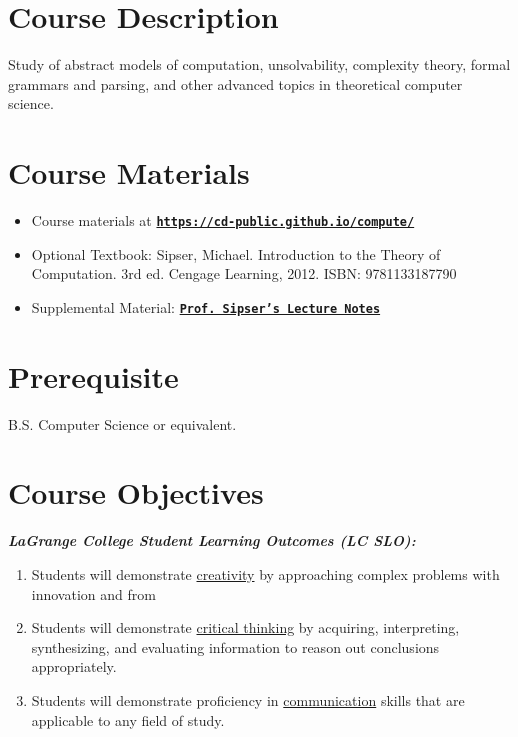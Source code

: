 \documentclass[11pt]{article}
\begin{document}

\section*{Course Description}

Study of abstract models of computation, unsolvability, complexity theory, formal grammars and parsing, and other advanced topics in theoretical computer science.


\section*{Course Materials}

\begin{itemize}
\item Course materials at \href{https://cd-public.github.io/compute/}{\tt\bf https://cd-public.github.io/compute/}
\item Optional Textbook: Sipser, Michael. Introduction to the Theory of Computation. 3rd ed. Cengage Learning, 2012. ISBN: 9781133187790
\item Supplemental Material: \href{https://ocw.mit.edu/courses/18-404j-theory-of-computation-fall-2020/pages/lecture-notes/}{\tt\bf Prof. Sipser's Lecture Notes}
\end{itemize}


\section*{Prerequisite}
B.S. Computer Science or equivalent.


\section*{Course Objectives}
\textbf{\textit{LaGrange College Student Learning Outcomes (LC SLO):}}

\begin{enumerate}
\item Students will demonstrate \underline{creativity} by approaching complex problems with innovation and from
\item Students will demonstrate \underline{critical thinking} by acquiring, interpreting, synthesizing, and evaluating
information to reason out conclusions appropriately.
\item Students will demonstrate proficiency in \underline{communication} skills that are applicable to any field of
study.
\end{enumerate}
\end{document}
